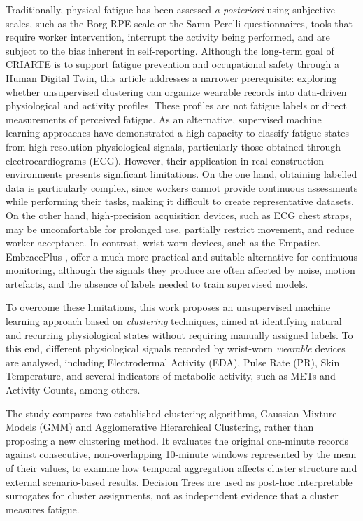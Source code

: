 \documentclass[a4paper,fleqn]{cas-sc}
\newcommand{\newtext}[1]{{\color{magenta}#1}}
\newcommand{\newtextblue}[1]{{\color{blue}#1}}
\begin{document}
Traditionally, physical fatigue has been assessed \textit{a posteriori} using subjective scales, such as the Borg RPE scale or the Samn-Perelli questionnaires, tools that require worker intervention, interrupt the activity being performed, and are subject to the bias inherent in self-reporting. \newtext{Although the long-term goal of CRIARTE is to support fatigue prevention and occupational safety through a Human Digital Twin, this article addresses a narrower prerequisite: exploring whether unsupervised clustering can organize wearable records into data-driven physiological and activity profiles. These profiles are not fatigue labels or direct measurements of perceived fatigue.} As an alternative, supervised machine learning approaches have demonstrated a high capacity to classify fatigue states from high-resolution physiological signals, particularly those obtained through electrocardiograms (ECG). However, their application in real construction environments presents significant limitations. On the one hand, obtaining labelled data is particularly complex, since workers cannot provide continuous assessments while performing their tasks, making it difficult to create representative datasets. On the other hand, high-precision acquisition devices, such as ECG chest straps, may be uncomfortable for prolonged use, partially restrict movement, and reduce worker acceptance. In contrast, wrist-worn devices, such as the Empatica EmbracePlus \cite{empatica_embraceplus}, offer a much more practical and suitable alternative for continuous monitoring, although the signals they produce are often affected by noise, motion artefacts, and the absence of labels needed to train supervised models.

To overcome these limitations, this work proposes an unsupervised machine learning approach based on \textit{clustering} techniques, aimed at identifying natural and recurring physiological states without requiring manually assigned labels. To this end, different physiological signals recorded by wrist-worn \textit{wearable} devices are analysed, including Electrodermal Activity (EDA), Pulse Rate (PR), Skin Temperature, and several indicators of metabolic activity, such as METs and Activity Counts, among others.

\newtextblue{The study compares two established clustering algorithms, Gaussian Mixture Models (GMM) and Agglomerative Hierarchical Clustering, rather than proposing a new clustering method. It evaluates the original one-minute records against consecutive, non-overlapping 10-minute windows represented by the mean of their values, to examine how temporal aggregation affects cluster structure and external scenario-based results. Decision Trees are used as post-hoc interpretable surrogates for cluster assignments, not as independent evidence that a cluster measures fatigue.}
\end{document}
